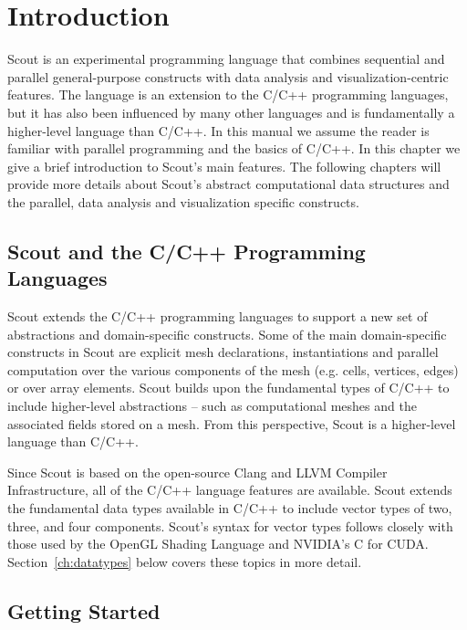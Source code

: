 \let\clearforchapter\par %

\chapter{Introduction}

Scout is an experimental programming language that combines sequential and parallel
general-purpose constructs with data analysis and visualization-centric features.  
The language is an extension to the C/C++ programming languages, but 
it has also been influenced by many other languages and is fundamentally a higher-level 
language than C/C++.  In this manual we assume the reader is familiar with parallel 
programming and the basics of C/C++.  In this chapter we give a brief
introduction to Scout's main features.
The following chapters will provide more details about Scout's abstract 
computational data structures and the parallel, data analysis and visualization specific 
constructs.

\section{Scout and the C/C++ Programming Languages}
\label{ch1:scout-clang}

Scout extends the C/C++ programming languages to support a new set of abstractions and
domain-specific constructs.  Some of the main domain-specific constructs in Scout are
explicit mesh declarations, instantiations and parallel
computation over the various components of the mesh (e.g. cells, vertices, edges) or
over array elements.  Scout builds upon the fundamental types of C/C++ to include higher-level 
abstractions -- such 
as computational meshes and the associated fields stored on a mesh.  From this perspective, 
Scout is a higher-level language than C/C++.

Since Scout is based on the open-source Clang and LLVM Compiler Infrastructure, all of 
the C/C++ language features are available. 
Scout extends the fundamental data types
available in C/C++ to include vector types of two, three, and four components.  Scout's 
syntax for vector types follows closely with those used by the OpenGL Shading Language
and NVIDIA's C for CUDA.  Section~\ref{ch:datatypes} below covers these topics in more 
detail.

\section{Getting Started}
\label{ch1:started}

